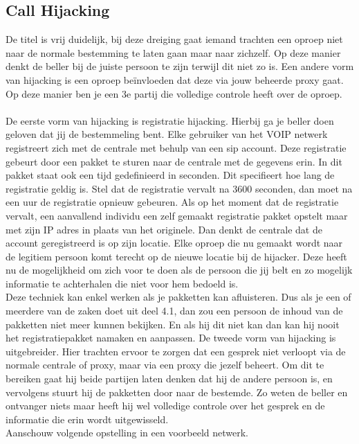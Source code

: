 \documentclass[pdftex,a4paper,12pt,twoside]{report}
\begin{document}
\subsection{Call Hijacking}
De titel is vrij duidelijk, bij deze dreiging gaat iemand trachten een oproep niet naar de normale bestemming te laten gaan maar naar zichzelf. Op deze manier denkt de beller bij de juiste persoon te zijn terwijl dit niet zo is. Een andere vorm van hijacking is een oproep beïnvloeden dat deze via jouw beheerde proxy gaat. Op deze manier ben je een 3e partij die volledige controle heeft over de oproep. 
\\ \\
De eerste vorm van hijacking is registratie hijacking. Hierbij ga je beller doen geloven dat jij de bestemmeling bent. Elke gebruiker van het VOIP netwerk registreert zich met de centrale met behulp van een sip account. Deze registratie gebeurt door een pakket te sturen naar de centrale met de gegevens erin. In dit pakket staat ook een tijd gedefinieerd in seconden. Dit specifieert hoe lang de registratie geldig is. Stel dat de registratie vervalt na 3600 seconden, dan moet na een uur de registratie opnieuw gebeuren. Als op het moment dat de registratie vervalt, een aanvallend individu een zelf gemaakt registratie pakket opstelt maar met zijn IP adres in plaats van het originele. Dan denkt de centrale dat de account geregistreerd is op zijn locatie. Elke oproep die nu gemaakt wordt naar de legitiem persoon komt terecht op de nieuwe locatie bij de hijacker. Deze heeft nu de mogelijkheid om zich voor te doen als de persoon die jij belt en zo mogelijk informatie te achterhalen die niet voor hem bedoeld is.\\
Deze techniek kan enkel werken als je pakketten kan afluisteren. Dus als je een of meerdere van de zaken doet uit deel 4.1, dan zou een persoon de inhoud van de pakketten niet meer kunnen bekijken. En als hij dit niet kan dan kan hij nooit het registratiepakket namaken en aanpassen.
\newpage
De tweede vorm van hijacking is uitgebreider. Hier trachten ervoor te zorgen dat een gesprek niet verloopt via de normale centrale of proxy, maar via een proxy die jezelf beheert. Om dit te bereiken gaat hij beide partijen laten denken dat hij de andere persoon is, en vervolgens stuurt hij de pakketten door naar de bestemde. Zo weten de beller en ontvanger niets maar heeft hij wel volledige controle over het gesprek en de informatie die erin wordt uitgewisseld.\\
Aanschouw volgende opstelling in een voorbeeld netwerk.
\end{document}

